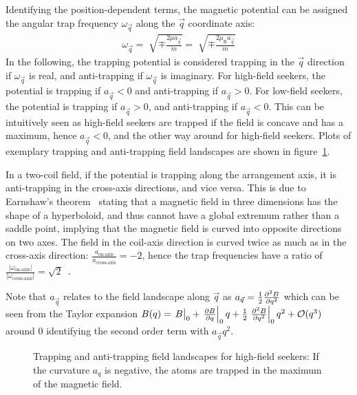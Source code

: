 Identifying the position-dependent terms, the magnetic potential can be assigned the angular trap frequency $\omega_{\vec q}$ along the $\vec q$ coordinate axis:
\begin{align}\label{eq:trap_omega_definition}
    \omega_{\vec q} = \sqrt[]{\mp\frac{2 \mu a_{\vec q}}{m}} = \sqrt[]{\mp\frac{2 \mu_\text{B} a_{\vec q}}{m}}
\end{align}
In the following, the trapping potential is considered trapping in the ${\vec q}$ direction if $\omega_{\vec q}$ is real, and anti-trapping if $\omega_{\vec q}$ is imaginary. For high-field seekers, the potential is trapping if $a_{\vec q} < 0$ and anti-trapping if $a_{\vec q} > 0$. For low-field seekers, the potential is trapping if $a_{\vec q} > 0$, and anti-trapping if $a_{\vec q} < 0$. This can be intuitively seen as high-field seekers are trapped if the field is concave and has a maximum, hence $a_{\vec q} < 0$, and the other way around for high-field seekers. Plots of exemplary trapping and anti-trapping field landscapes are shown in figure~\ref{fig:magnetic_field_curvature_examples}.

In a two-coil field, if the potential is trapping along the arrangement axis, it is anti-trapping in the cross-axis directions, and vice versa. This is due to Earnshaw's theorem~\cite{earnshaw_nature_1842} stating that a magnetic field in three dimensions has the shape of a hyperboloid, and thus cannot have a global extremum rather than a saddle point, implying that the magnetic field is curved into opposite directions on two axes. The field in the coil-axis direction is curved twice as much as in the cross-axis direction: $\frac{a_\text{on-axis}}{a_\text{cross-axis}} = -2$, hence the trap frequencies have a ratio of $\frac{|\omega_\text{on-axis}|}{|\omega_\text{cross-axis}|} = \sqrt{2}$~\cite{hagemann_setup_2020}.

Note that $a_{\vec q}$ relates to the field landscape along ${\vec q}$ as $a_{\vec q}  = \frac{1}{2} \pdv[2]{B}{q}$ which can be seen from the Taylor expansion $B(q) = \eval{B}_{0} + \eval{\pdv{B}{q}}_{0} q + \frac{1}{2} \eval{\pdv[2]{B}{q}}_{0} q^2 + \mathcal{O}(q^3)$ around $0$ identifying the second order term with $a_{\vec q} q^2$.

\begin{figure}
    \caption{Trapping and anti-trapping field landscapes for high-field seekers: If the curvature $a_q$ is negative, the atoms are trapped in the maximum of the magnetic field.}
    \label{fig:magnetic_field_curvature_examples}
\end{figure}

